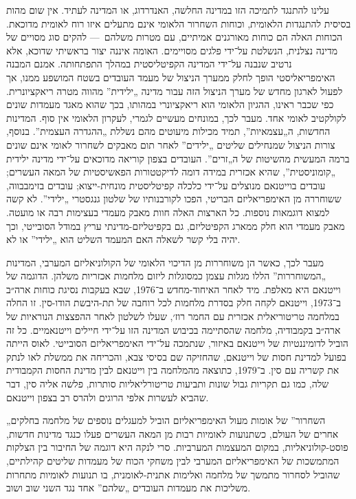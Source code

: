 עלינו להתנגד לתמיכה הזו במדינה החלשה, האנדרדוג, או המדינה לעתיד. אין שום מהות בסיסית להתנגדות הלאומית, וכוחות השחרור הלאומי אינם מתעלים איזו רוח לאומית מדוכאת. הכוחות האלה הם כוחות מאורגנים אמיתיים, עם מטרות משלהם~— להקים סוג מסויים של מדינה נצלנית, הנשלטת על־ידי פלגים מסויימים. האומה איננה יצור בראשיתי שדוכא, אלא נרטיב שנבנה על־ידי המדינה הקפיטליסטית במהלך התפתחותה. אמנם המבנה האימפריאליסטי הופך לחלק ממערך הניצול של מעמד העובדים בשטח המושפע ממנו, אך לפעול לארגון מחדש של מערך הניצול הזה עבור מדינה „ילידית” מהווה מטרה ריאקציונרית. כפי שכבר ראינו, ההגיון הלאומי הוא ריאקציונרי במהותו, בכך שהוא מאגד מעמדות שונים לקולקטיב לאומי אחד. מעבר לכך, במונחים מעשיים לגמרי, לעקרון הלאומי אין סוף. המדינות החדשות, ה„עצמאיות”, תמיד מכילות מיעוטים מהם נשללת „ההגדרה העצמית”. בנוסף, צורות הניצול שמנחילים שליטים „ילידים” לאחר תום מאבקים לשחרור לאומי אינם שונים ברמה המעשית מהשיטות של ה„זרים”. העובדים בצפון קוריאה מדוכאים על־ידי מדינה ילידית „קומוניסטית”, שהיא אכזרית במידה דומה לדיקטטורות הפאשיסטיות של המאה העשרים; עובדים בוייטנאם מנוצלים על־ידי כלכלה קפיטליסטית מונחית-ייצוא; עובדים בזימבבווה, ששוחררה מן האימפריאליזם הבריטי, הפכו לקורבנותיו של שלטון גנגסטרי „ילידי”. לא קשה למצוא דוגמאות נוספות. כל הארצות האלה חוות מאבק מעמדי בעצימות רבה או מועטה. מאבק מעמדי הוא חלק ממארג הקפיטליזם, גם בקפיטליזם-מדינתי עריץ במודל הסובייטי, וכך יהיה בלי קשר לשאלה האם המעמד השליט הוא „ילידי” או לא.

מעבר לכך, כאשר הן משוחררות מן הדיכוי הלאומי של הקולוניאליזם המערבי, המדינות „המשוחררות” הללו מגלות עצמן כמסוגלות ליזום מלחמות אכזריות משלהן. הדוגמה של וייטנאם היא מאלפת. מיד לאחר האיחוד-מחדש ב־1976, שבא בעקבות נסיגת כוחות ארה״ב ב־1973, וייטנאם לקחה חלק בסדרת מלחמות לכל רוחבה של תת-היבשת הודו-סין. זו החלה במלחמה טריטוריאלית אכזרית עם החמר רוז׳, שעלו לשלטון לאחר ההפצצות הנוראיות של ארה״ב בקמבודיה, מלחמה שהסתיימה בכיבוש המדינה הזו על־ידי חיילים וייטנאמיים. כל זה הוביל לדומיננטיות של וייטנאם באיזור, שנתמכה על־ידי האימפריאליזם הסובייטי. לאוס הייתה בפועל למדינת חסות של וייטנאם, שהחזיקה שם בסיסי צבא, והכריחה את ממשלת לאו לנתק את קשריה עם סין. ב־1979, כתוצאה מהמלחמה בין וייטנאם לבין מדינת החסות הקמבודית שלה, כמו גם תקריות גבול שונות ותביעות טריטורליאליות סותרות, פלשה אליה סין, דבר שהביא לעשרות אלפי הרוגים ולהרס רב בצפון וייטנאם.

„השחרור” של אומות מעול האימפריאליזם הוביל למעגלים נוספים של מלחמה בחלקים אחרים של העולם, כשתנועות לאומיות רבות מן המאה העשרים פעלו כנגד מדינות חדשות, פוסט-קולוניאליות, במקום המעצמות המערביות. סרי לנקה היא דוגמה של החיבור בין הצלקות המתמשכות של האימפריאליזם המערבי לבין משחקי הכוח של מעמדות שליטים קהילתיים, שהוביל לסחרור מתמשך של מלחמה ואלימות אתנית-לאומנית, בו תנועות לאומיות מתחרות משליכות את מעמדות העובדים „שלהם” אחד נגד השני שוב ושוב.

